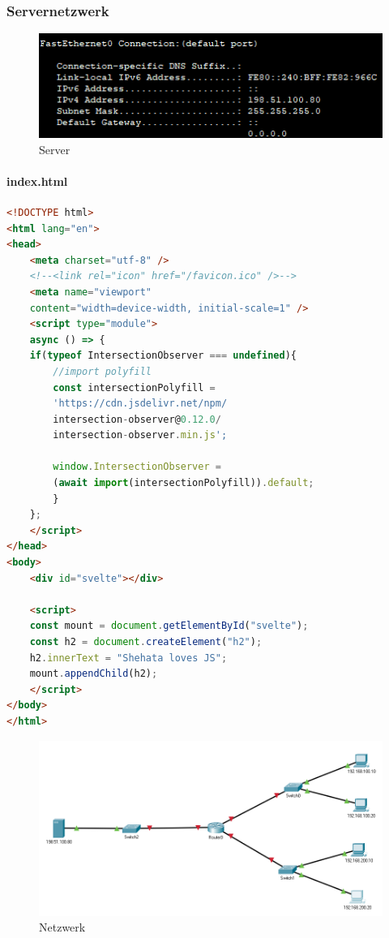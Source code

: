 \subsubsection{Servernetzwerk}

\begin{figure}[!htb]
    \centering
    \includegraphics[width=\textwidth]{./img/build/server.png}
    \caption{Server}
\end{figure}

\pagebreak
\paragraph{index.html}
\begin{lstlisting}[language=HTML]
<!DOCTYPE html>
<html lang="en">
<head>
    <meta charset="utf-8" />
    <!--<link rel="icon" href="/favicon.ico" />-->
    <meta name="viewport" 
    content="width=device-width, initial-scale=1" />
    <script type="module">
    async () => {
    if(typeof IntersectionObserver === undefined){
        //import polyfill
        const intersectionPolyfill = 
        'https://cdn.jsdelivr.net/npm/
        intersection-observer@0.12.0/
        intersection-observer.min.js';
        
        window.IntersectionObserver = 
        (await import(intersectionPolyfill)).default;
        }
    };
    </script>
</head>
<body>
    <div id="svelte"></div>

    <script>
    const mount = document.getElementById("svelte");
    const h2 = document.createElement("h2");
    h2.innerText = "Shehata loves JS";
    mount.appendChild(h2);
    </script>
</body>
</html>
\end{lstlisting}

\begin{figure}[!htb]
    \centering
    \includegraphics[width=\textwidth]{./img/build/start.png}
    \caption{Netzwerk}
\end{figure}